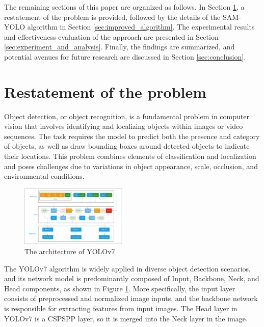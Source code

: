 \documentclass[aic]{iosart2x}
\begin{document}
The remaining sections of this paper are organized as follows. In Section \ref{sec:restatement_of_the_problem}, a restatement of the problem is provided, followed by the details of the SAM-YOLO algorithm in Section \ref{sec:improved_algorithm}. The experimental results and effectiveness evaluation of the approach are presented in Section \ref{sec:experiment_and_analysis}. Finally, the findings are summarized, and potential avenues for future research are discussed in Section \ref{sec:conclusion}.
\section{Restatement of the problem} \label{sec:restatement_of_the_problem}

Object detection, or object recognition, is a fundamental problem in computer vision that involves identifying and localizing objects within images or video sequences. The task requires the model to predict both the presence and category of objects, as well as draw bounding boxes around detected objects to indicate their locations. This problem combines elements of classification and localization and poses challenges due to variations in object appearance, scale, occlusion, and environmental conditions.

\begin{figure}[!ht]
    \centering
    \includegraphics[width=0.45\textwidth]{yolov7_structure.pdf}
    \caption{The architecture of YOLOv7}
    \label{fig:Structure_of_YOLOv7}
\end{figure}

The YOLOv7 algorithm is widely applied in diverse object detection scenarios, and its network model is predominantly composed of Input, Backbone, Neck, and Head components, as shown in Figure \ref{fig:Structure_of_YOLOv7}. More specifically, the input layer consists of preprocessed and normalized image inputs, and the backbone network is responsible for extracting features from input images. The Head layer in YOLOv7 is a CSPSPP layer, so it is merged into the Neck layer in the image. 
\end{document}
